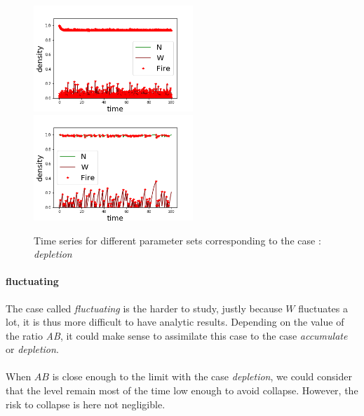 \documentclass{article}
\begin{document}
\begin{figure}[h!]
\centering
\includegraphics[width=6cm]{continue_1.png}
\includegraphics[width=6cm]{continue_2.png}
\caption{Time series for different parameter sets corresponding to the case : \textit{depletion}}
\end{figure}




\newpage
\paragraph{fluctuating \\}
The case called \textit{fluctuating} is the harder to study, justly because $W$ fluctuates a lot, it is thus more difficult to have analytic results. Depending on the value of the ratio \textit{AB}, it could make sense to assimilate this case to the case \textit{accumulate} or \textit{depletion}.


\paragraph{}
When $AB$ is close enough to the limit with the case \textit{depletion}, we could consider that the level remain most of the time low enough to avoid collapse. However, the risk to collapse is here not negligible.
\end{document}
